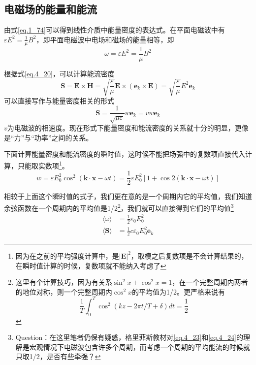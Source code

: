     \subsection{电磁场的能量和能流}      
        由式\ref{eq.1_74}可以得到线性介质中能量密度的表达式。在平面电磁波中有$\varepsilon E^2 =\frac{1}{\mu}B^2$，即平面电磁波中电场和磁场的能量相等，即
        \begin{equation}
            \omega = \varepsilon E^2 =\frac{1}{\mu}B^2
        \end{equation}

        根据式\ref{eq.4_20}，可以计算能流密度
        \begin{equation}
            \label{eq.4_23}
            \boldsymbol{S}=\boldsymbol{E} \times \boldsymbol{H}=\sqrt{\frac{\varepsilon}{\mu}} \boldsymbol{E} \times\left(\boldsymbol{e}_{k} \times \boldsymbol{E}\right)=\sqrt{\frac{\varepsilon}{\mu}} E^{2} \boldsymbol{e}_{k}
        \end{equation}
        可以直接写作与能量密度相关的形式
        \begin{equation}
            \label{eq.4_24}
            \boxed{\boldsymbol{S}=\frac{1}{\sqrt{\mu \varepsilon}} w \boldsymbol{e}_{k}=v w \boldsymbol{e}_{k}}
        \end{equation}
        $v$为电磁波的相速度。现在形式下能量密度和能流密度的关系就十分的明显，更像是“力”与“功率”之间的关系。

        下面计算能量密度和能流密度的瞬时值，这时候不能把场强中的复数项直接代入计算，只能取实数项\footnote{因为在之前的平均强度计算中，是$|\boldsymbol{E}|^2$，取模之后复数项是不会计算结果的，在瞬时值计算的时候，复数项就不能纳入考虑了}。
        \begin{equation}
            w=\varepsilon E_{0}^{2} \cos ^{2}(\boldsymbol{k} \cdot \boldsymbol{x}-\omega t)=\frac{1}{2} \varepsilon E_{0}^{2}[1+\cos 2(\boldsymbol{k} \cdot \boldsymbol{x}-\omega t)]
        \end{equation}
        
        相较于上面这个瞬时值的式子，我们更在意的是一个周期内它的平均值，我们知道余弦函数在一个周期内的平均值是1/2\footnote{这里有个计算技巧，因为有关系$\sin^2 x + \cos^2 x =1 $，在一个完整周期内两者的地位对称，则一个完整周期内$\cos^2 x$的平均值为1/2。更严格来说有\[\frac{1}{T} \int_{0}^{T} \cos ^{2}(k z-2 \pi t / T+\delta) d t=\frac{1}{2}\]}，我们就可以直接得到它们的平均值\footnote{\textcolor[RGB]{143,143,143}{Question：在这里笔者仍保有疑惑，格里菲斯教材对\ref{eq.4_23}和\ref{eq.4_24}的理解是宏观情况下电磁波包含许多个周期，而考虑一个周期的平均能流的时候就只取1/2，是否有些牵强？}}
        \begin{equation}
            \label{eq.4_26}
            \boxed{\begin{aligned}
            \langle \omega \rangle &=\frac{1}{2} \varepsilon_{0} E_{0}^{2} \\
            \langle\boldsymbol{S}\rangle &=\frac{1}{2} c \varepsilon_{0} E_{0}^{2} \boldsymbol{e}_k
            \end{aligned}}
        \end{equation}
